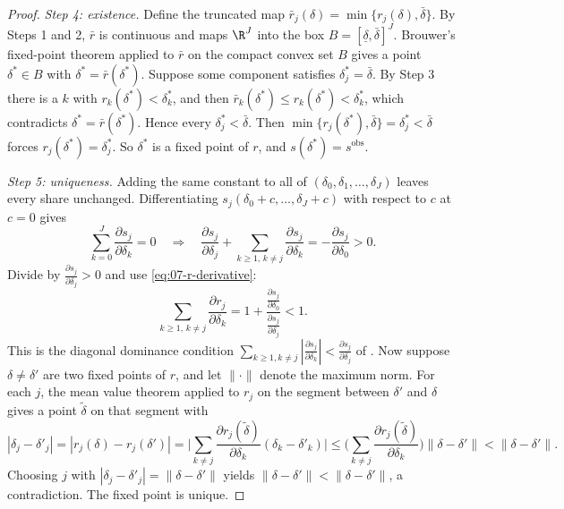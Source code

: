 \begin{proof}
\emph{Step 4: existence.} Define the truncated map $\bar r_j(\delta) = \min\{r_j(\delta), \bar\delta\}$. By Steps 1
and 2, $\bar r$ is continuous and maps $\R^J$ into the box $B = [\underline\delta, \bar\delta]^J$. Brouwer's
fixed-point theorem applied to $\bar r$ on the compact convex set $B$ gives a point $\delta^* \in B$ with
$\delta^* = \bar r(\delta^*)$. Suppose some component satisfies $\delta^*_j = \bar\delta$. By Step 3 there is a
$k$ with $r_k(\delta^*) < \delta^*_k$, and then $\bar r_k(\delta^*) \le r_k(\delta^*) < \delta^*_k$, which
contradicts $\delta^* = \bar r(\delta^*)$. Hence every $\delta^*_j < \bar\delta$. Then $\min\{r_j(\delta^*),
\bar\delta\} = \delta^*_j < \bar\delta$ forces $r_j(\delta^*) = \delta^*_j$. So $\delta^*$ is a fixed point of $r$,
and $s(\delta^*) = s^{\mathrm{obs}}$.

\emph{Step 5: uniqueness.} Adding the same constant to all of $(\delta_0, \delta_1, \dots, \delta_J)$ leaves every
share unchanged. Differentiating $s_j(\delta_0 + c, \dots, \delta_J + c)$ with respect to $c$ at $c = 0$ gives
\begin{equation*}
  \sum_{k=0}^{J}\frac{\partial s_j}{\partial \delta_k} = 0
  \quad\Longrightarrow\quad
  \frac{\partial s_j}{\partial \delta_j} + \sum_{k \ge 1,\, k \ne j}\frac{\partial s_j}{\partial \delta_k}
  = -\frac{\partial s_j}{\partial \delta_0} > 0 .
\end{equation*}
Divide by $\frac{\partial s_j}{\partial \delta_j} > 0$ and use \eqref{eq:07-r-derivative}:
\begin{equation}\label{eq:07-rowsum}
  \sum_{k \ge 1,\, k \ne j}\frac{\partial r_j}{\partial \delta_k}
  = 1 + \frac{\frac{\partial s_j}{\partial \delta_0}}{\frac{\partial s_j}{\partial \delta_j}} < 1 .
\end{equation}
This is the diagonal dominance condition $\sum_{k \ge 1, k \ne j}|\frac{\partial s_j}{\partial \delta_k}| <
\frac{\partial s_j}{\partial \delta_j}$ of \citet[eq.~A2]{Berry1994}. Now suppose $\delta \ne \delta'$ are two
fixed points of $r$, and let $\|\cdot\|$ denote the maximum norm. For each $j$, the mean value theorem applied
to $r_j$ on the segment between $\delta'$ and $\delta$ gives a point $\tilde\delta$ on that segment with
\begin{equation*}
  |\delta_j - \delta'_j| = |r_j(\delta) - r_j(\delta')|
  = \Big|\sum_{k \ne j}\frac{\partial r_j(\tilde\delta)}{\partial \delta_k}(\delta_k - \delta'_k)\Big|
  \le \Big(\sum_{k \ne j}\frac{\partial r_j(\tilde\delta)}{\partial \delta_k}\Big)\|\delta - \delta'\|
  < \|\delta - \delta'\| .
\end{equation*}
Choosing $j$ with $|\delta_j - \delta'_j| = \|\delta - \delta'\|$ yields $\|\delta - \delta'\| < \|\delta -
\delta'\|$, a contradiction. The fixed point is unique.
\end{proof}

